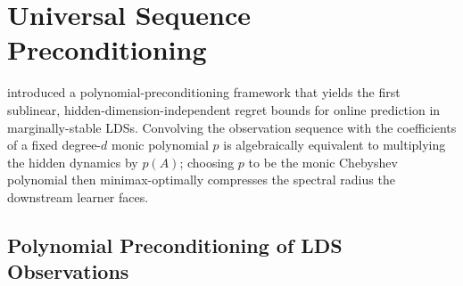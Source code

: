 \documentclass[11pt]{article}
\theoremstyle{plain}
\theoremstyle{definition}
\theoremstyle{remark}
\newcommand{\abs}[1]{\left\lvert#1\right\rvert}
\begin{document}

\section{Universal Sequence Preconditioning}
\label{sec:precondition}
\label{sec:chebyshev}

\citet{marsden2024universal} introduced a polynomial-preconditioning framework that yields the first sublinear, hidden-dimension-independent regret bounds for online prediction in marginally-stable LDSs. Convolving the observation sequence with the coefficients of a fixed degree-$d$ monic polynomial $p$ is algebraically equivalent to multiplying the hidden dynamics by $p(A)$; choosing $p$ to be the monic Chebyshev polynomial then minimax-optimally compresses the spectral radius the downstream learner faces. 

\subsection{Polynomial Preconditioning of LDS Observations}
\label{sec:lds-identity}
\end{document}
